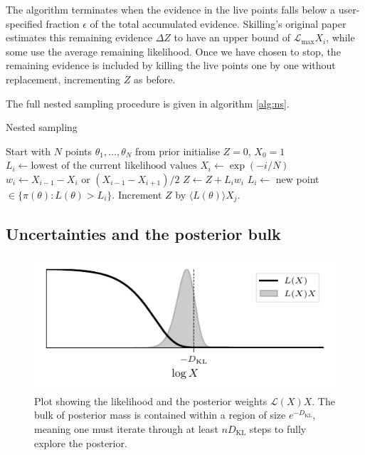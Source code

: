 \documentclass[usenatbib]{mnras} %
\newcommand{\Like}{\mathcal{L}}
\newcommand{\DKL}{D_\mathrm{KL}}
\begin{document}
The algorithm terminates when the evidence in the live points falls below a user-specified fraction $\epsilon$ of the total accumulated evidence. Skilling's original paper estimates this remaining evidence $\Delta Z$ to have an upper bound of $ \Like_\mathrm{max} X_i$, while some use the average remaining likelihood. Once we have chosen to stop, the remaining evidence is included by killing the live points one by one without replacement, incrementing $Z$ as before. 
\par
The full nested sampling procedure is given in algorithm \ref{alg:ns}. 
\begin{algorithm}
\caption{Nested sampling}\label{alg:ns}
\begin{algorithmic}
\State Start with $N$ points $\theta_1, \ldots, \theta_N$ from prior
\State \hspace{\algorithmicindent} initialise $Z = 0$, $X_0 = 1$
\State $L_i \gets \text{lowest of the current likelihood values}$
\State $X_i \gets \exp(-i/N)$
\State $w_i \gets X_{i-1} - X_i$ or $(X_{i-1} - X_{i+1})/2$
\State $Z \gets Z + L_i w_i$
\State $L_i \gets $ new point $\in \{\pi(\theta): L(\theta) > L_i\}$.
\EndFor
\State Increment $Z$ by $\langle L(\theta) \rangle X_j$.
\end{algorithmic}
\end{algorithm}

\subsection{Uncertainties and the posterior bulk}\label{subsec:Uncertainties and the posterior bulk}
\begin{figure}
\begin{center}
	\includegraphics{figures/LX.pdf}
\end{center}
\caption{Plot showing the likelihood and the posterior weights $\Like(X)X$. The bulk of posterior mass is contained within a region of size $e^{-\DKL}$, meaning one must iterate through at least $n\DKL$ steps to fully explore the posterior.}
\label{fig:LX}
\end{figure}
\end{document}
